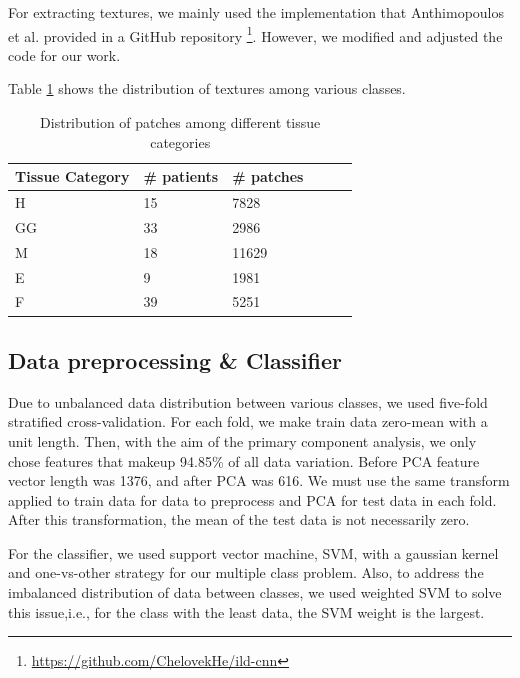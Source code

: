 \documentclass[conference]{IEEEtran}
\begin{document}
For extracting textures, we mainly used the implementation that Anthimopoulos et al. \cite{textureextract} provided in a GitHub repository \footnote{ \url{https://github.com/ChelovekHe/ild-cnn}}. However, we modified and adjusted the code for our work.

Table \ref{cm:datadist} shows the distribution of textures among various classes.



\begin{table}[tbh]
 \caption{\small{Distribution of patches among different tissue categories}}
\label{cm:datadist}
\small
\centering
\begin{tabular}{@{}llllll@{}}
\toprule
 Tissue Category& \# patients & \# patches & \\ \midrule
 
H& 15&7828 \\ 
GG&33&2986\\ 
M&18 &11629 \\ 
E&9 &1981 \\ 
F& 39&5251 \\ \bottomrule

\end{tabular}
\end{table}



\subsection{\textbf{Data preprocessing \& Classifier}}
Due to unbalanced data distribution between various classes, we used five-fold stratified cross-validation. For each fold, we make train data zero-mean with a unit length. Then, with the aim of the primary component analysis, we only chose features that makeup 94.85\% of all data variation. Before PCA feature vector length was 1376, and after PCA was 616. We must use the same transform applied to train data for data to preprocess and PCA for test data in each fold. After this transformation, the mean of the test data is not necessarily zero.

For the classifier, we used support vector machine, SVM, with a gaussian kernel and one-vs-other strategy for our multiple class problem. Also, to address the imbalanced distribution of data between classes, we used weighted SVM to solve this issue,i.e., for the class with the least data, the SVM weight is the largest.
\end{document}
